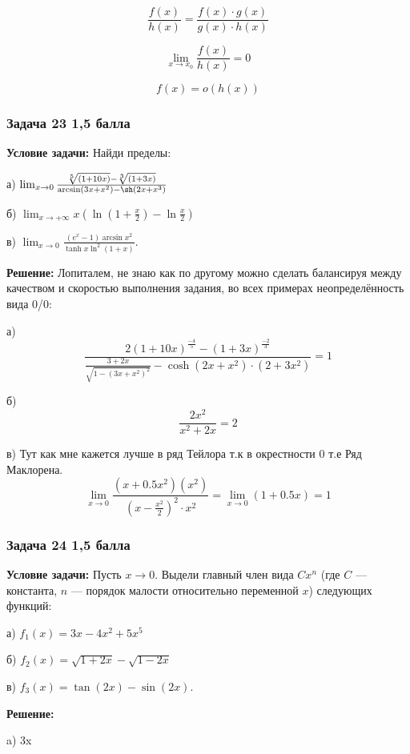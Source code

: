 \documentclass[a4paper,12pt]{article}
\begin{document}
\[
\frac{f(x)}{h(x)} = \frac{f(x)\cdot g(x)}{g(x) \cdot h(x)}
\]

\[
\lim_{x \to x_0} \frac{f(x)}{h(x)} = 0
\]

\[
f(x) = o(h(x))
\]

\vspace{1cm}

\subsubsection{Задача 23 \hfill 1,5 балла}
\textbf{Условие задачи:} Найди пределы:

а) \( \lim_{x \to 0} \frac{\sqrt[5]{(1 + 10x)} - \sqrt[3]{(1 + 3x)}}{\arcsin(3x + x^2) - \sh(2x + x^3)} \)

б) \( \lim_{x \to +\infty} x \left( \ln \left( 1 + \frac{x}{2} \right) - \ln \frac{x}{2} \right) \)

в) \( \lim_{x \to 0} \frac{(e^x - 1) \arcsin x^2}{\tanh x \ln^2 (1 + x)}\).

\textbf{Решение: } 
Лопиталем, не знаю как по другому можно сделать балансируя между качеством и скоростью выполнения задания, во всех примерах неопределённость вида 0/0:

а)
\[
\frac{2(1+10x)^{\frac{-4}{5}} - (1+3x)^{\frac{-2}{3}}}{\frac{3+2x}{\sqrt{1-(3x+x^2)^2}} - \cosh(2x+x^2)\cdot (2+3x^2)} = 1
\]

б)
\[
\frac{2x^2}{x^2+2x} = 2
\]

в)
Тут как мне кажется лучше в ряд Тейлора т.к в окрестности 0 т.е Ряд Маклорена.
\[
\lim_{x \to 0} \frac{(x+0.5x^2)(x^2)}{(x-\frac{x^2}{2})^2\cdot x^2} = \lim_{x \to 0} (1+0.5x) = 1
\]

\vspace{1cm}

\subsubsection{Задача 24 \hfill 1,5 балла}
\textbf{Условие задачи:} Пусть \( x \to 0 \). Выдели главный член вида \( Cx^n \) (где \( C \) — константа, \( n \) — порядок малости относительно переменной \( x \)) следующих функций:

а) \( f_1(x) = 3x - 4x^2 + 5x^5 \)

б) \( f_2(x) = \sqrt{1 + 2x} - \sqrt{1 - 2x} \)

в) \( f_3(x) = \tan(2x) - \sin(2x) \).

\textbf{Решение: }

a) 3x
\end{document}
